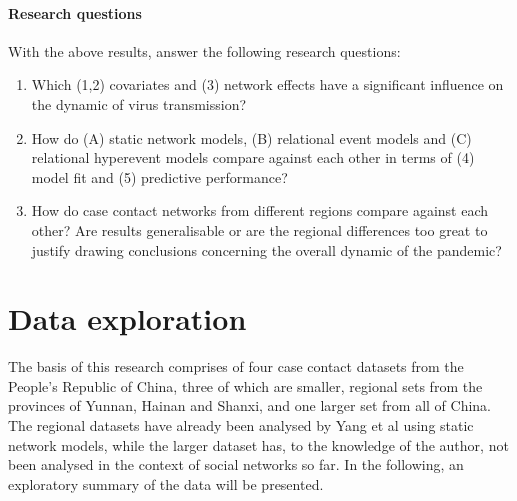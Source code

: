 \documentclass{article}
\begin{document}
	\paragraph{Research questions} With the above results, answer the following research questions:
	\begin{enumerate}
		\item Which (1,2) covariates and (3) network effects have a significant influence on the dynamic of virus transmission?
		\item How do (A) static network models, (B) relational event models and (C) relational hyperevent models compare against each other in terms of (4) model fit and (5) predictive performance?
		\item How do case contact networks from different regions compare against each other? Are results generalisable or are the regional differences too great to justify drawing conclusions concerning the overall dynamic of the pandemic?
	\end{enumerate}
	
	\section{Data exploration}
	\label{sec:Data_exploration}
	The basis of this research comprises of four case contact datasets from the People's Republic of China, three of which are smaller, regional sets from the provinces of Yunnan, Hainan and Shanxi, and one larger set from all of China. The regional datasets have already been analysed by Yang et al \cite{hainan_publication,shanxi_publication} using static network models, while the larger dataset has, to the knowledge of the author, not been analysed in the context of social networks so far. In the following, an exploratory summary of the data will be presented.
	
\end{document}
